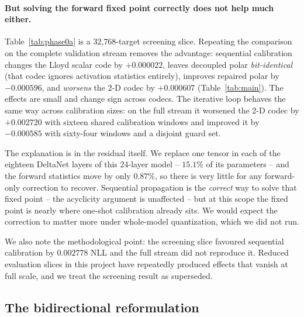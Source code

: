 \paragraph{But solving the forward fixed point correctly does not help much
either.} Table~\ref{tab:phase0a} is a 32{,}768-target screening slice. Repeating
the comparison on the complete validation stream removes the advantage:
sequential calibration changes the Lloyd scalar code by $+0.000022$, leaves
decoupled polar \emph{bit-identical} (that codec ignores activation statistics
entirely), improves repaired polar by $-0.000596$, and \emph{worsens} the 2-D
codec by $+0.000607$ (Table~\ref{tab:main}). The effects are small and change
sign across codecs. The iterative loop behaves the same way across calibration
sizes: on the full stream it worsened the 2-D codec by $+0.002720$ with sixteen
shared calibration windows and improved it by $-0.000585$ with sixty-four
windows and a disjoint guard set.

The explanation is in the residual itself. We replace one tensor in each of the
eighteen DeltaNet layers of this 24-layer model -- $15.1\%$ of its parameters --
and the forward statistics move by only $0.87\%$, so there is very little for any
forward-only correction to recover. Sequential propagation is the
\emph{correct} way to solve that fixed point -- the acyclicity argument is
unaffected -- but at this scope the fixed point is nearly where one-shot
calibration already sits. We would expect the correction to matter more under
whole-model quantization, which we did not run.

We also note the methodological point: the screening slice favoured sequential
calibration by $0.002778$ NLL and the full stream did not reproduce it. Reduced
evaluation slices in this project have repeatedly produced effects that vanish
at full scale, and we treat the screening result as superseded.

\subsection{The bidirectional reformulation}

